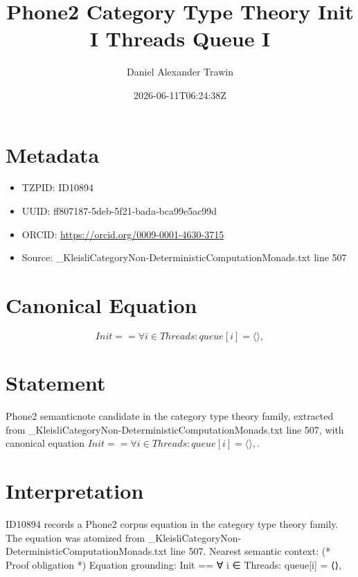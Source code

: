 \documentclass[11pt]{article}
\title{Phone2 Category Type Theory Init I Threads Queue I}
\author{Daniel Alexander Trawin}
\date{2026-06-11T06:24:38Z}
\begin{document}
\maketitle
\section*{Metadata}
\begin{itemize}
\item TZPID: ID10894
\item UUID: ff807187-5deb-5f21-bada-bca99e5ac99d
\item ORCID: \url{https://orcid.org/0009-0001-4630-3715}
\item Source: _KleisliCategoryNon-DeterministicComputationMonads.txt line 507
\end{itemize}
\section*{Canonical Equation}
\[
Init == ∀ i ∈ Threads: queue[i] = ⟨⟩,
\]
\section*{Statement}
Phone2 semanticnote candidate in the category type theory family, extracted from _KleisliCategoryNon-DeterministicComputationMonads.txt line 507, with canonical equation $Init == ∀ i ∈ Threads: queue[i] = ⟨⟩,$.
\section*{Interpretation}
ID10894 records a Phone2 corpus equation in the category type theory family. The equation was atomized from _KleisliCategoryNon-DeterministicComputationMonads.txt line 507. Nearest semantic context: (* Proof obligation *) Equation grounding: Init == ∀ i ∈ Threads: queue[i] = ⟨⟩,
\end{document}
